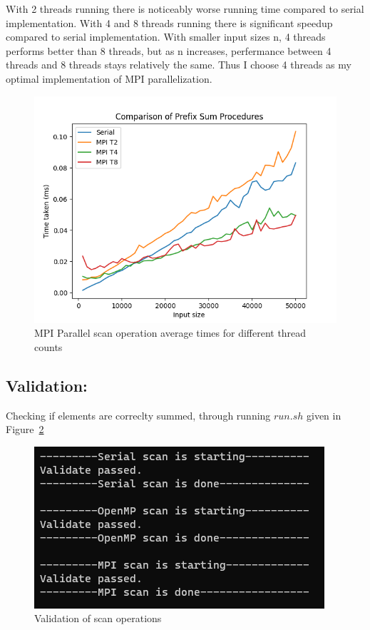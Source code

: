 	With 2 threads running there is noticeably worse running time compared to serial implementation. With 4 and 8 threads running there is significant speedup compared to serial implementation. With smaller input sizes n, 4 threads performs better than 8 threads, but as n increases, perfermance between 4 threads and 8 threads stays relatively the same. Thus I choose 4 threads as my optimal implementation of MPI parallelization.
	\begin{figure}[!htb]
		\centering
		\includegraphics[width=0.6\linewidth]{scan_mpi_comparison.png}
		\caption{MPI Parallel scan operation average times for different thread counts}
		\label{fig:fig_scan_mpi_comparison}
	\end{figure}

	\subsection{Validation:}
	Checking if elements are correclty summed, through running $run.sh$ given in Figure~\ref{fig:fig_validation}
	\begin{figure}[!htb]
		\centering
		\includegraphics[width=0.5\linewidth]{validation.png}
		\caption{Validation of scan operations}
		\label{fig:fig_validation}
	\end{figure}

